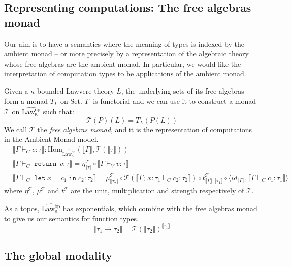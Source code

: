 \documentclass[acmsmall, screen, review, anonymous]{acmart}
\theoremstyle{definition}
\newcommand{\arr}{\rightarrow}
\newcommand{\setc}{\mathrm{Set}}
\newcommand{\lawcop}{\mathrm{Law_{\kappa}^{op}}}
\newcommand{\pshlawcop}{\widehat{\lawcop}}
\newcommand{\homset}[3]{\mathrm{Hom}_{#1}(#2, #3)}
\newcommand{\arrow}[2]{{#2}^{#1}}
\newcommand{\sem}[1]{\llbracket #1 \rrbracket}
\newcommand{\unit}[1]{\eta^{#1}}
\newcommand{\mult}[1]{\mu^{#1}}
\newcommand{\strength}[1]{t^{#1}}
\newcommand{\mon}{\mathcal{T}}
\newcommand{\types}{\mathrel{:}}
\newcommand{\ccons}[2]{#1;\,#2}
\newcommand{\lbind}[3]{\ccons{#1}{#2\types#3}}
\newcommand{\returnname}{\mathop{\mathtt{return}}}
\newcommand{\return}[1]{\returnname\, #1}
\newcommand{\letvname}{\mathop{\mathtt{let}}}
\newcommand{\letv}[3]{\letvname #1 = #2 \mathop{\mathtt{in}} #3}
\newcommand{\turnv}{\mathrel{\vdash_V}}
\newcommand{\turnc}{\mathrel{\vdash_C}}
\begin{document}
\subsection{Representing computations: The free algebras monad}
\label{sec:monad}

Our aim is to have a semantics where the meaning of types is indexed by
the ambient monad -- or more precisely by a representation of the
algebraic theory whose free algebras are the ambient monad. In
particular, we would like the interpretation of computation types to be
applications of the ambient monad.

Given a $\kappa$-bounded Lawvere theory $L$, the underlying sets of its
free algebras form a monad $T_L$ on $\setc$. $T_{\_}$ is functorial and
we can use it to construct a monad $\mon$ on $\pshlawcop$ such that:
\begin{equation*}
\mon(P)(L) = T_L(P(L))
\end{equation*}
We call $\mon$ the \emph{free algebras monad}, and it is the
representation of computations in the Ambient Monad model.
\begin{align*}
  &\sem{\Gamma \turnc c \types \tau} \mathrel{:}
    \homset{\pshlawcop}{\sem{\Gamma}}{\mon(\sem{\tau})} \\
  &\sem{\Gamma \turnc \return{v} \types \tau} =
    \unit{\mon}_{\sem{\tau}} \circ \sem{\Gamma \turnv v \types \tau} \\
  &\sem{\Gamma \turnc \letv{x}{c_1}{c_2} \types \tau_2} =
    \mult{\mon}_{\sem{\tau_2}}
    \circ \mon(\sem{\lbind{\Gamma}{x}{\tau_1} \turnc c_2 \types \tau_2})
    \circ \strength{\mon}_{\sem{\Gamma}, \sem{\tau_1}}
    \circ \langle id_{\sem{\Gamma}}, \sem{\Gamma \turnc c_1 \types \tau_1} \rangle
\end{align*}
where $\unit{\mon}$, $\mult{\mon}$ and $\strength{\mon}$ are the unit,
multiplication and strength respectively of $\mon$.

As a topos, $\pshlawcop$ has exponentials, which combine with the free
algebras monad to give us our semantics for function types.
\begin{equation*}
  \sem{\tau_1 \arr \tau_2} = \arrow{\sem{\tau_1}}{\mon(\sem{\tau_2})}
\end{equation*}

\subsection{The global modality}
\label{sec:global}
\end{document}

